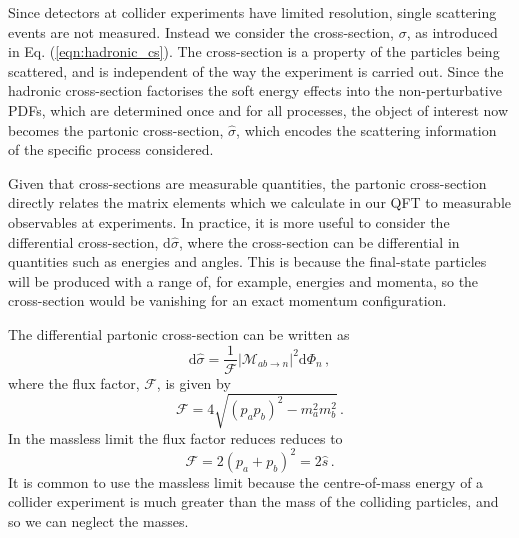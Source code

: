 \documentclass[main.tex]{subfiles}
\begin{document}
    Since detectors at collider experiments
    have limited resolution, single scattering
    events are not measured. Instead we consider
    the cross-section, $\sigma$, as introduced in
    Eq. (\ref{eqn:hadronic_cs}). The cross-section is a property
    of the particles being scattered, and is independent
    of the way the experiment is carried out.
    Since the hadronic cross-section factorises
    the soft energy effects into the non-perturbative PDFs,
    which are determined once and for all
    processes, the object of interest now becomes the
    partonic cross-section, $\hat{\sigma}$, which
    encodes the scattering information of the specific
    process considered.

    Given that cross-sections are measurable
    quantities, the partonic cross-section directly
    relates the matrix elements which we calculate in our QFT
    to measurable observables at experiments.
    In practice, it is more useful to consider the
    differential cross-section, $\mathrm{d}\hat{\sigma}$,
    where the cross-section can be differential
    in quantities such as energies and angles.
    This is because the final-state particles
    will be produced with a range of, for example,
    energies and momenta, so the cross-section would
    be vanishing for an exact momentum configuration.

    The differential partonic cross-section can be written as
    \begin{equation}\label{eqn:dsigma}
        \mathrm{d}\hat{\sigma} = \dfrac{1}{\mathcal{F}}|\mathcal{M}_{ab \rightarrow n}|^{2} \mathrm{d}\Phi_{n} \, ,
    \end{equation}
    where the flux factor, $\mathcal{F}$, is given by
    \begin{equation}\label{eqn:flux}
        \mathcal{F} = 4\sqrt{(p_{a}p_{b})^{2} - m_{a}^{2}m_{b}^{2}} \, .
    \end{equation}
    In the massless limit the flux factor reduces reduces to
    \begin{equation}\label{eqn:massless_flux}
        \mathcal{F} = 2(p_{a} + p_{b})^{2} = 2\hat{s} \, .
    \end{equation}
    It is common to use the massless limit because
    the centre-of-mass energy of a collider
    experiment is much greater than the mass
    of the colliding particles, and so we can
    neglect the masses.
\end{document}
